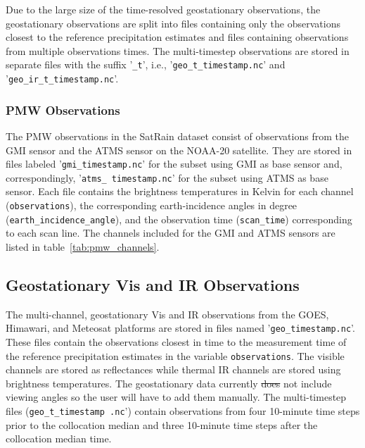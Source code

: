 \documentclass[11pt]{article}
\providecommand{\DIFadd}[1]{{\protect\color{blue}\uwave{#1}}} %
\providecommand{\DIFdel}[1]{{\protect\color{red}\sout{#1}}}                      %
\providecommand{\DIFaddbegin}{} %
\providecommand{\DIFaddend}{} %
\providecommand{\DIFdelbegin}{} %
\providecommand{\DIFdelend}{} %
\begin{document}
Due to the large size of the time-resolved geostationary observations, the
geostationary observations are split into files containing only the observations
closest to the reference precipitation estimates and files containing
observations from multiple observations times. The multi-timestep observations
are stored in separate files with the suffix '\texttt{\_t}', i.e.,
'\texttt{geo\_t\_\textlangle timestamp\textrangle.nc}' and '\texttt{geo\_ir\_t\_\textlangle timestamp\textrangle.nc}'.

\subsubsection{PMW Observations}

The PMW observations in the SatRain dataset consist of observations from the GMI
sensor and the ATMS sensor on the NOAA-20 satellite. They are stored in files
labeled '\texttt{gmi\_\textlangle timestamp\textrangle.nc}' for the subset using
GMI as base sensor and, correspondingly, '\texttt{atms\_\textlangle
  timestamp\textrangle.nc}' for the subset using ATMS as base sensor. Each file
contains the brightness temperatures in Kelvin for each channel
(\texttt{observations}), the corresponding earth-incidence angles in degree
(\texttt{earth\_incidence\_angle}), and the observation time
(\texttt{scan\_time}) corresponding to each scan line. The channels included for
the GMI and ATMS sensors are listed in table~\ref{tab:pmw_channels}.

\subsection{Geostationary Vis and IR Observations}

The multi-channel, geostationary Vis and IR observations from the GOES,
Himawari, and Meteosat platforms are stored in files named
'\texttt{geo\_\textlangle timestamp\textrangle.nc}'. These files contain the
observations closest in time to the measurement time of the reference
precipitation estimates in the variable \texttt{observations}. The visible
channels are stored as reflectances while thermal IR channels are stored using
brightness temperatures. The geostationary data currently \DIFdelbegin \DIFdel{does }\DIFdelend \DIFaddbegin \DIFadd{do }\DIFaddend not include
viewing angles so the user will have to add them manually. The multi-timestep
files (\texttt{geo\_t\_\textlangle timestamp \textrangle.nc}') contain
observations from four 10-minute time steps prior to the collocation median \DIFaddbegin \DIFadd{time }\DIFaddend and
three 10-minute time steps after the collocation median time.
\end{document}
